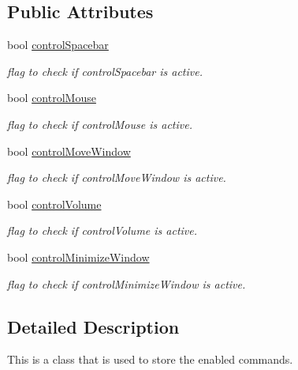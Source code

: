 \subsection*{Public Attributes}
\begin{DoxyCompactItemize}
\item 
bool \hyperlink{class_gesture_detection_1_1_enabled_command_abf2d47343a7abbcd43baa577861dd4b7}{control\+Spacebar}
\begin{DoxyCompactList}\small\item\em flag to check if control\+Spacebar is active. \end{DoxyCompactList}\item 
bool \hyperlink{class_gesture_detection_1_1_enabled_command_a49930173fcb2bab93322e9c60d31cad5}{control\+Mouse}
\begin{DoxyCompactList}\small\item\em flag to check if control\+Mouse is active. \end{DoxyCompactList}\item 
bool \hyperlink{class_gesture_detection_1_1_enabled_command_a5f91d83cc097a360d4c39a30563eaa18}{control\+Move\+Window}
\begin{DoxyCompactList}\small\item\em flag to check if control\+Move\+Window is active. \end{DoxyCompactList}\item 
bool \hyperlink{class_gesture_detection_1_1_enabled_command_a8d2542571d224cdca24f428bc066215f}{control\+Volume}
\begin{DoxyCompactList}\small\item\em flag to check if control\+Volume is active. \end{DoxyCompactList}\item 
bool \hyperlink{class_gesture_detection_1_1_enabled_command_a0901b0b7dbda1712065df28848ff4c0d}{control\+Minimize\+Window}
\begin{DoxyCompactList}\small\item\em flag to check if control\+Minimize\+Window is active. \end{DoxyCompactList}\end{DoxyCompactItemize}


\subsection{Detailed Description}
This is a class that is used to store the enabled commands. 

